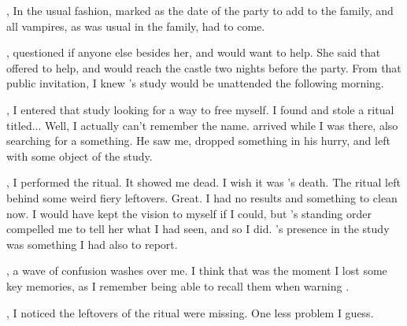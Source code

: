 {, In the usual fashion,  marked  as the date of the party to add  to the family, and all vampires, as was usual in the family, had to come.

,  questioned if anyone else besides her,  and  would want to help. She said that  offered to help, and would reach the castle two nights before the party. From that public invitation, I knew 's study would be unattended the following morning.

, I entered that study looking for a way to free myself. I found and stole a ritual titled... Well, I actually can't remember the name.  arrived while I was there, also searching for a something. He saw me, dropped something in his hurry, and left with some object of the study.

, I performed the ritual. It showed me  dead. I wish it was 's death. The ritual left behind some weird  fiery leftovers. Great. I had no results and something to clean now. I would have kept the vision to myself if I could, but 's standing order compelled me to tell her what I had seen, and so I did. 's presence in the study was something I had also to report. 

, a wave of confusion washes over me. I think that was the moment I lost some key memories, as I remember being able to recall them when warning .

, I noticed the leftovers of the ritual were missing. One less problem I guess.


}
